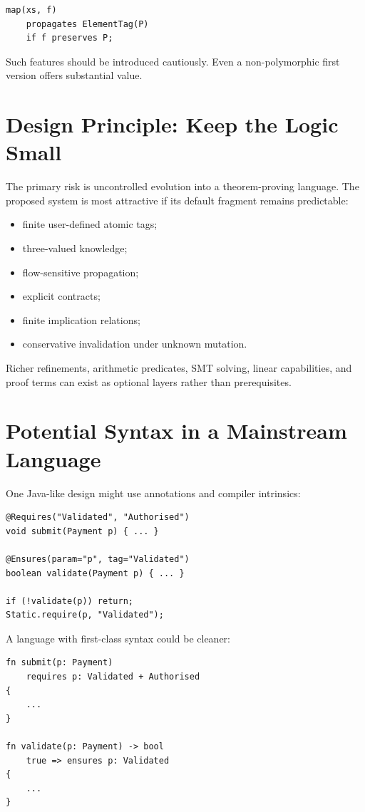 \documentclass[11pt]{article}
\begin{document}
\begin{lstlisting}
map(xs, f)
    propagates ElementTag(P)
    if f preserves P;
\end{lstlisting}

Such features should be introduced cautiously. Even a non-polymorphic first version offers substantial value.

\section{Design Principle: Keep the Logic Small}
The primary risk is uncontrolled evolution into a theorem-proving language. The proposed system is most attractive if its default fragment remains predictable:

\begin{itemize}
  \item finite user-defined atomic tags;
  \item three-valued knowledge;
  \item flow-sensitive propagation;
  \item explicit contracts;
  \item finite implication relations;
  \item conservative invalidation under unknown mutation.
\end{itemize}

Richer refinements, arithmetic predicates, SMT solving, linear capabilities, and proof terms can exist as optional layers rather than prerequisites.

\section{Potential Syntax in a Mainstream Language}
One Java-like design might use annotations and compiler intrinsics:

\begin{lstlisting}
@Requires("Validated", "Authorised")
void submit(Payment p) { ... }

@Ensures(param="p", tag="Validated")
boolean validate(Payment p) { ... }

if (!validate(p)) return;
Static.require(p, "Validated");
\end{lstlisting}

A language with first-class syntax could be cleaner:

\begin{lstlisting}
fn submit(p: Payment)
    requires p: Validated + Authorised
{
    ...
}

fn validate(p: Payment) -> bool
    true => ensures p: Validated
{
    ...
}
\end{lstlisting}
\end{document}
